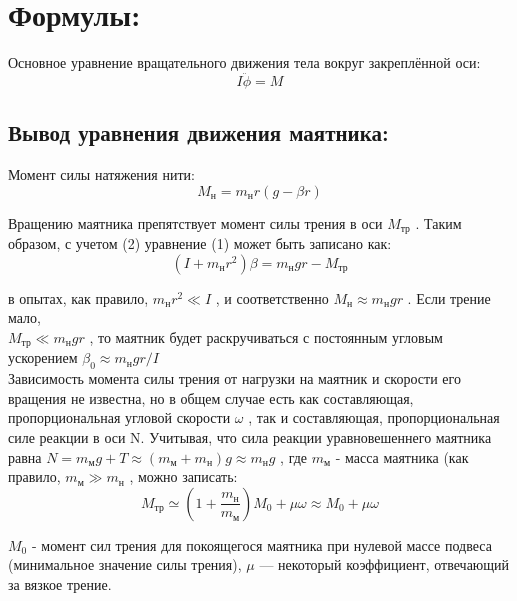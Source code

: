 \section{\Large Формулы: }


\newcommand{\formula}[2]{
\noindent#1\\[0.2cm]
    \begin{equation}
        #2
    \end{equation}
}

\newcommand{\mth}[1]{
\begin{math}
    #1
\end{math}
}
\newcommand{\ruB}[1]{
    _{\text{#1}}
}

\formula{Основное уравнение вращательного движения тела вокруг закреплённой оси:}{I\ddot{\phi} = M}

\subsection{\large Вывод уравнения движения маятника:}

\formula{Момент силы натяжения нити:}{M\ruB{н} = m\ruB{н}r\left(g - \beta r\right)}

\formula{Вращению маятника препятствует момент силы трения в оси \mth{M\ruB{тр}}.
Таким образом, с учетом (2) уравнение (1) может быть записано как:}{\left( I + m\ruB{н}r^2\right)\beta = m\ruB{н}gr - M\ruB{тр}}

 в опытах, как правило, \mth{m\ruB{н}r^2 \ll I}, и соответственно \mth{M\ruB{н} \approx m\ruB{н}gr}. Если трение мало,\\ \mth{ M\ruB{тр} \ll m\ruB{н}gr}, то маятник будет раскручиваться с постоянным угловым ускорением \mth{\beta_0 \approx m\ruB{н}gr/I}\\[0.4cm]

\formula{Зависимость момента силы трения от нагрузки на маятник и скорости его вращения не известна, но в общем случае есть как составляющая, пропорциональная угловой скорости \mth{\omega}, так и составляющая, пропорциональная силе реакции в оси N. Учитывая, что сила реакции уравновешеннего маятника равна \mth{N = m\ruB{м}g + T \approx \left( m\ruB{м} + m\ruB{н} \right)g \approx m\ruB{н}g}, где \mth{m\ruB{м}} - масса маятника (как правило, \mth{m\ruB{м} \gg m\ruB{н}}, можно записать:
}{
M\ruB{тр} \simeq \left(1 + \frac{m\ruB{н}}{m\ruB{м}}\right)M_0 + \mu\omega \approx M_0 + \mu\omega}

 \mth{M_0} - момент сил трения для покоящегося маятника при нулевой массе подвеса (минимальное значение силы трения), \mth{\mu}— некоторый коэффициент, отвечающий за вязкое трение.\\[0.2]

